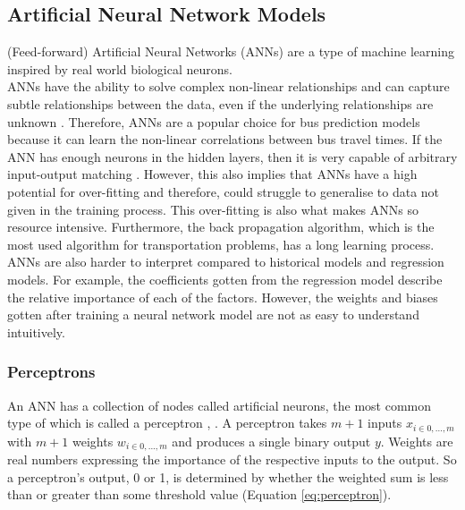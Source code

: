 \subsection{Artificial Neural Network Models}
\label{section:ml-models-research}

(Feed-forward) Artificial Neural Networks (ANNs) are a type of machine learning inspired by real world biological neurons. \\

ANNs have the ability to solve complex non-linear relationships and can capture subtle relationships between the data, even if the underlying relationships are unknown \cite{dynamic-gps}. Therefore, ANNs are a popular choice for bus prediction models because it can learn the non-linear correlations between bus travel times. If the ANN has enough neurons in the hidden layers, then it is very capable of arbitrary input-output matching \cite{intelligent-transport-systems}. However, this also implies that ANNs have a high potential for over-fitting and therefore, could struggle to generalise to data not given in the training process. This over-fitting is also what makes ANNs so resource intensive. Furthermore, the back propagation algorithm, which is the most used algorithm for transportation problems, has a long learning process. \\

ANNs are also harder to interpret compared to historical models and regression models. For example, the coefficients gotten from the regression model describe the relative importance of each of the factors. However, the weights and biases gotten after training a neural network model are not as easy to understand intuitively. 

\subsubsection{Perceptrons}

An ANN has a collection of nodes called artificial neurons, the most common type of which is called a perceptron \cite{methods-for-ds-slides}, \cite{neural-networks-book}. A perceptron takes $m + 1$ inputs $x_{i\in{0,...,m}}$ with $m + 1$ weights $w_{i\in{0,...,m}}$ and produces a single binary output $y$. Weights are real numbers expressing the importance of the respective inputs to the output. So a perceptron's output, 0 or 1, is determined by whether the weighted sum is less than or greater than some threshold value (Equation \ref{eq:perceptron}).

